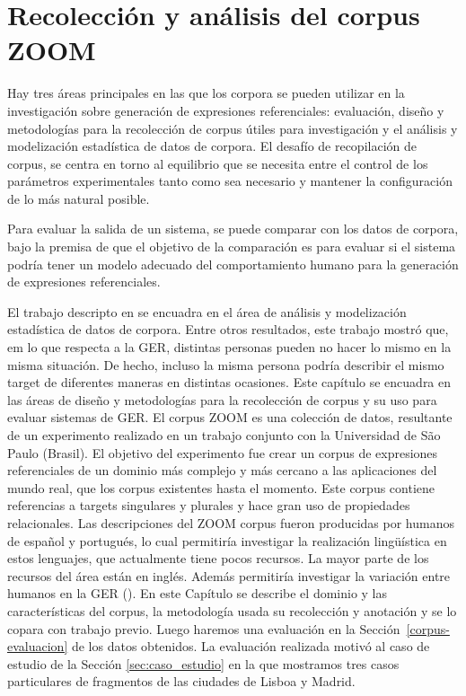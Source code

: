 \chapter{Recolecci\'on y an\'alisis del corpus ZOOM}
\label{sec:corpus}

Hay tres \'areas principales en las que los corpora se pueden utilizar en la investigaci\'on sobre generaci\'on de expresiones referenciales:
evaluaci\'on, dise\~no y metodolog\'ias para la recolecci\'on de corpus \'utiles para investigaci\'on y el an\'alisis y modelizaci\'on estad\'istica de datos de corpora.
El desaf\'io de recopilaci\'on de corpus, se centra en torno al equilibrio que se necesita
entre el control de los par\'ametros experimentales tanto como sea necesario
y mantener la configuraci\'on de lo m\'as natural posible. 

Para evaluar la salida de un sistema, se puede 
comparar con los datos de corpora, bajo la premisa de que el objetivo de la comparaci\'on es
para evaluar si el sistema podr\'ia tener un modelo adecuado del comportamiento humano para la generaci\'on de expresiones referenciales.


El trabajo descripto en \cite{viet:gene11} se encuadra en el \'area de an\'alisis y modelizaci\'on estad\'istica de datos de corpora. Entre otros resultados, este trabajo mostr\'o que, em lo que respecta a la GER, distintas personas pueden no  hacer lo mismo en la misma situaci\'on. De hecho, incluso la misma persona podr\'ia describir el mismo target de diferentes maneras en distintas ocasiones.
Este cap\'itulo se encuadra en las \'areas de dise\~no y metodolog\'ias para la recolecci\'on de corpus y su uso para evaluar sistemas de GER.
El corpus ZOOM es una colecci\'on de datos, resultante de un experimento realizado en un trabajo conjunto con la Universidad de S\~ao Paulo (Brasil). El objetivo del experimento fue crear un corpus de expresiones referenciales de un dominio m\'as complejo y m\'as cercano a las aplicaciones del mundo real, que los corpus existentes hasta el momento. Este corpus contiene referencias a targets singulares y plurales y hace gran uso de propiedades relacionales. Las descripciones del ZOOM corpus fueron producidas por humanos de espa\~nol y portugu\'es, lo cual permitir\'ia investigar la realizaci\'on ling\"u\'istica en estos lenguajes, que actualmente tiene pocos recursos. La mayor parte de los recursos del \'area est\'an en ingl\'es. Adem\'as permitir\'ia investigar la variaci\'on entre humanos en la GER (\cite{trainable-speaker,romina-coling,non-det}). 
En este Cap\'itulo se describe el dominio y las caracter\'isticas del corpus, la metodolog\'ia usada su recolecci\'on y anotaci\'on y se lo copara con trabajo previo. Luego haremos una evaluaci\'on en la Secci\'on~\ref{corpus-evaluacion} de los datos obtenidos. La evaluaci\'on realizada motiv\'o al caso de estudio de la Secci\'on \ref{sec:caso_estudio} en la que mostramos tres casos particulares de fragmentos de las ciudades de Lisboa y Madrid.


